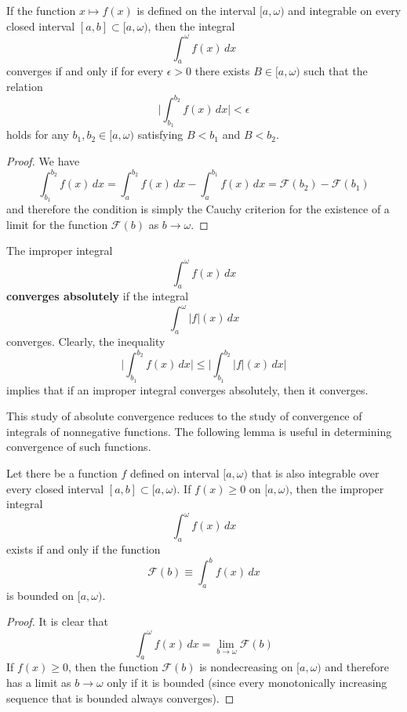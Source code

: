       \begin{theorem}
      If the function $x \mapsto f(x)$ is defined on the interval $[a, \omega)$ and integrable on every closed interval $[a, b] \subset [a, \omega)$, then the integral 
      \[\int_a^\omega f(x)\,dx\]
      converges if and only if for every $\epsilon > 0$ there exists $B \in [a, \omega)$ such that the relation
      \[\Bigg| \int_{b_1}^{b_2} f(x)\,dx \bigg| < \epsilon\]
      holds for any $b_1, b_2 \in [a, \omega)$ satisfying $B < b_1$ and $B < b_2$. 
      \end{theorem}
      \begin{proof}
      We have
      \[\int_{b_1}^{b_2} f(x)\,dx = \int_a^{b_2} f(x)\,dx - \int_a^{b_1} f(x)\,dx = \mathcal{F}(b_2) - \mathcal{F}(b_1)\]
      and therefore the condition is simply the Cauchy criterion for the existence of a limit for the function $\mathcal{F}(b)$ as $b \rightarrow \omega$. 
      \end{proof}

      \begin{definition}
        The improper integral 
        \[\int_a^\omega f(x)\,dx\]
        \textbf{converges absolutely} if the integral
        \[\int_a^\omega |f|(x)\,dx\]
        converges. Clearly, the inequality
        \[\Bigg| \int_{b_1}^{b_2} f(x)\,dx \Bigg| \leq \Bigg| \int_{b_1}^{b_2} |f|(x)\,dx \Bigg|\]
        implies that if an improper integral converges absolutely, then it converges. 
      \end{definition}

      This study of absolute convergence reduces to the study of convergence of integrals of nonnegative functions. The following lemma is useful in determining convergence of such functions. 

      \begin{lemma}
        Let there be a function $f$ defined on interval $[a, \omega)$ that is also integrable over every closed interval $[a, b] \subset [a, \omega)$. If $f(x) \geq 0$ on $[a, \omega)$, then the improper integral 
        \[\int_a^\omega f(x)\,dx\]
        exists if and only if the function 
        \[\mathcal{F}(b) \equiv \int_a^b f(x)\,dx\]
        is bounded on $[a, \omega)$. 
      \end{lemma}
      \begin{proof}
      It is clear that 
      \[\int_a^\omega f(x)\,dx = \lim_{b \rightarrow \omega} \mathcal{F}(b)\]
      If $f(x)\geq 0$, then the function $\mathcal{F}(b)$ is nondecreasing on $[a, \omega)$ and therefore has a limit as $b \rightarrow \omega$ only if it is bounded (since every monotonically increasing sequence that is bounded always converges). 
      \end{proof}

